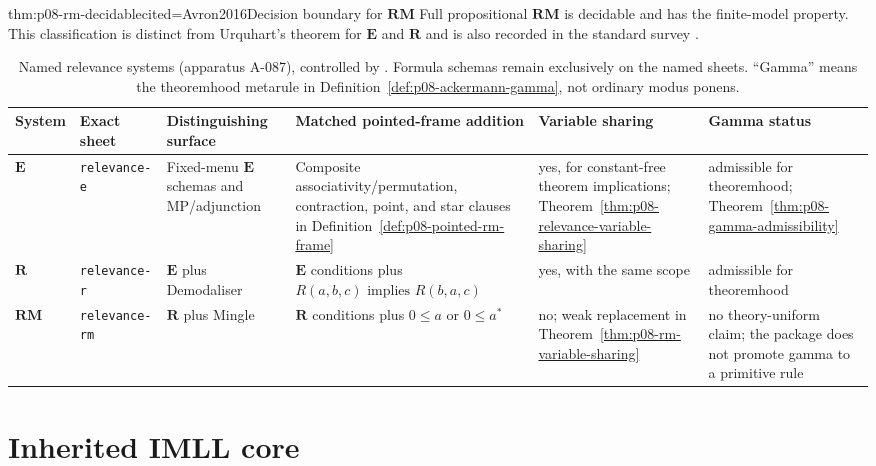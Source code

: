 \begin{hbtheorem}{thm:p08-rm-decidable}{cited=Avron2016}{Decision boundary for \(\mathbf{RM}\)}
Full propositional \(\mathbf{RM}\) is decidable and has the finite-model
property.  This classification is distinct from Urquhart's theorem for
\(\mathbf E\) and \(\mathbf R\) and is also recorded in the standard survey
\cite{DunnRestall2002}.
\end{hbtheorem}

\begin{table}[!htbp]
\centering
\begingroup\scriptsize
\setlength{\tabcolsep}{3pt}
\begin{tabular}{@{}p{}p{}p{}
  p{}p{}p{}@{}}
\toprule
System & Exact sheet & Distinguishing surface & Matched pointed-frame addition
& Variable sharing & Gamma status \\
\midrule
\(\mathbf E\) & \texttt{relevance-e} & Fixed-menu \(\mathbf E\) schemas and
MP/adjunction & Composite associativity/permutation, contraction, point, and
star clauses in Definition~\ref{def:p08-pointed-rm-frame} & yes, for
constant-free theorem implications; Theorem~\ref{thm:p08-relevance-variable-sharing}
& admissible for theoremhood; Theorem~\ref{thm:p08-gamma-admissibility} \\
\(\mathbf R\) & \texttt{relevance-r} & \(\mathbf E\) plus Demodaliser & \(\mathbf E\) conditions plus
  \(R(a,b,c)\text{ implies }R(b,a,c)\) & yes, with the same scope & admissible for
theoremhood \\
\(\mathbf{RM}\) & \texttt{relevance-rm} & \(\mathbf R\) plus Mingle & \(\mathbf R\) conditions plus
\(0\leq a\) or \(0\leq a^*\) & no; weak replacement in
Theorem~\ref{thm:p08-rm-variable-sharing} & no theory-uniform claim; the
package does not promote gamma to a primitive rule \\
\bottomrule
\end{tabular}
\endgroup
\caption{Named relevance systems (apparatus A-087), controlled by
\cite{AndersonBelnap1975,MeyerDunn1969,RoutleyMeyer1973,DunnRestall2002}.
Formula schemas remain exclusively on the named sheets.  ``Gamma'' means the
theoremhood metarule in Definition~\ref{def:p08-ackermann-gamma}, not ordinary
modus ponens.}
\label{tab:p08-relevance-systems}
\end{table}

\section{Inherited IMLL core}
\label{sec:p08-imll}

